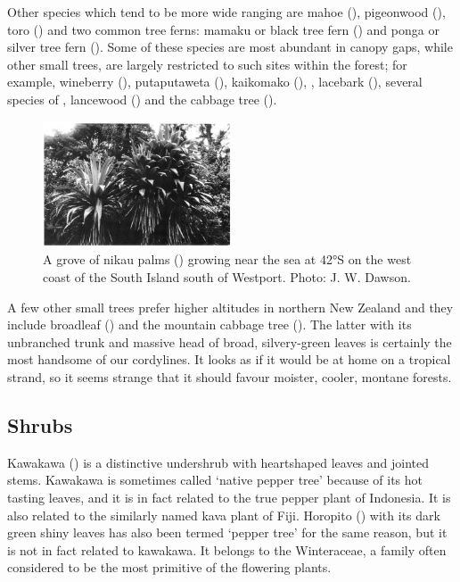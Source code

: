 Other species which tend to be more wide ranging are mahoe (), pigeonwood (), toro () and two common tree ferns: mamaku or black tree fern () and ponga or silver tree fern ().
Some of these species are most abundant in canopy gaps, while other small trees, are largely restricted to such sites within the forest; for example, wineberry (), putaputaweta (), kaikomako (),  , lacebark (), several species of , lancewood () and the cabbage tree ().

\begin{figure}
	\includegraphics[width=0.5\textwidth]{graphics/figure61cabbagetree.jpg}
	\centering
	\caption[A grove of nikau palms]{A grove of nikau palms () growing near the sea at 42°S on the west coast of the South Island south of Westport. Photo:  J. W. Dawson.}
	\label{fig:61cabbagetree}
\end{figure}

A few other small trees prefer higher altitudes in northern New Zealand and they include broadleaf () and the mountain cabbage tree ().
The latter with its unbranched trunk and massive head of broad, silvery-green leaves is certainly the most handsome of our cordylines.
It looks as if it would be at home on a tropical strand, so it seems strange that it should favour moister, cooler, montane forests.

\subsection{Shrubs}

Kawakawa () is a distinctive undershrub with heartshaped leaves and jointed stems.
Kawakawa is sometimes called `native pepper tree' because of its hot tasting leaves, and it is in fact related to the true pepper plant of Indonesia.
It is also related to the similarly named kava plant of Fiji.
Horopito () with its dark green shiny leaves has also been termed `pepper tree' for the same reason, but it is not in fact related to kawakawa.
It belongs to the Winteraceae, a family often considered to be the most primitive of the flowering plants.


